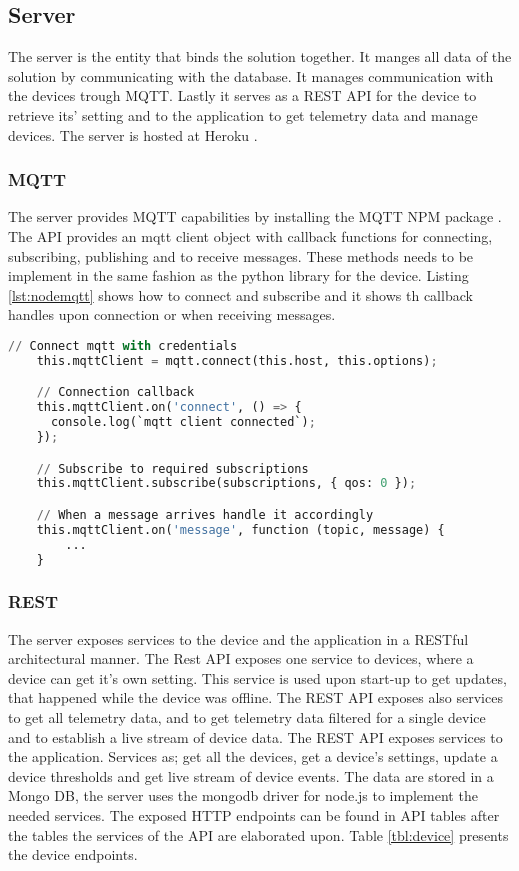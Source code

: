 \subsection{Server}
The server is the entity that binds the solution together. It manges all data of the solution by communicating with the database. It manages communication with the devices trough MQTT. Lastly it serves as a REST API for the device to retrieve its' setting and to the application to get telemetry data and manage devices. The server is hosted at Heroku \cite{heroku}. 

\subsubsection{MQTT}
The server provides MQTT capabilities by installing the MQTT NPM package \cite{mqtt}. The API provides an mqtt client object with callback functions for connecting, subscribing, publishing and to receive messages. These methods needs to be implement in the same fashion as the python library for the device. Listing \ref{lst:nodemqtt} shows how to connect and subscribe and it shows th callback handles upon connection or when receiving messages. 

\begin{lstlisting}[language=Python, caption=Node.js MQTT, label={lst:nodemqtt}, basicstyle=\tiny]
    // Connect mqtt with credentials
    this.mqttClient = mqtt.connect(this.host, this.options);

    // Connection callback
    this.mqttClient.on('connect', () => {
      console.log(`mqtt client connected`);
    });

    // Subscribe to required subscriptions
    this.mqttClient.subscribe(subscriptions, { qos: 0 });

    // When a message arrives handle it accordingly
    this.mqttClient.on('message', function (topic, message) {
        ...
    }
\end{lstlisting}

\subsubsection{REST}
The server exposes services to the device and the application in a RESTful architectural manner. The Rest API exposes one service to devices, where a device can get it's own setting. This service is used upon start-up to get updates, that happened while the device was offline. 
The REST API exposes also services to get all telemetry data, and to get telemetry data filtered for a single device and to establish a live stream of device data. 
The REST API exposes services to the application. Services as; get all the devices, get a device's settings, update a device thresholds and get live stream of device events. The data are stored in a Mongo DB, the server uses the mongodb driver for node.js \cite{mongodriver} to implement the needed services. The exposed HTTP endpoints can be found in API tables after the tables the services of the API are elaborated upon. Table \ref{tbl:device} presents the device endpoints. 

